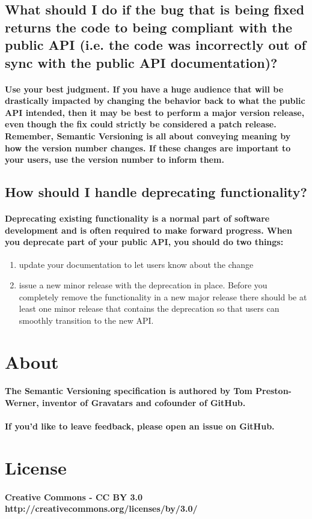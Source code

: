 \subsection{ What should I do if the bug that is being fixed returns the code to 
being compliant with the public API (i.e. the code was incorrectly out of sync with 
the public API documentation)? }

\paragraph{
Use your best judgment. If you have a huge audience that will be drastically impacted 
by changing the behavior back to what the public API intended, then it may be best to 
perform a major version release, even though the fix could strictly be considered a 
patch release. Remember, Semantic Versioning is all about conveying meaning by how 
the version number changes. If these changes are important to your users, use the 
version number to inform them.
}

\subsection{ How should I handle deprecating functionality? }

\paragraph{
Deprecating existing functionality is a normal part of software development and 
is often required to make forward progress. When you deprecate part of your public 
API, you should do two things:
}
\begin{enumerate}
\item
update your documentation to let users know about the change
\item
issue a new minor release with the deprecation in place. Before you completely remove the functionality in a new major release there should be at least one minor release that contains the deprecation so that users can smoothly transition to the new API.
\end{enumerate}

\section{About}

\paragraph{
The Semantic Versioning specification is authored by Tom Preston-Werner, inventor of Gravatars and cofounder of GitHub.
}
\paragraph{
If you'd like to leave feedback, please open an issue on GitHub.
}

\section{License}

\paragraph{
Creative Commons - CC BY 3.0 http://creativecommons.org/licenses/by/3.0/
}
